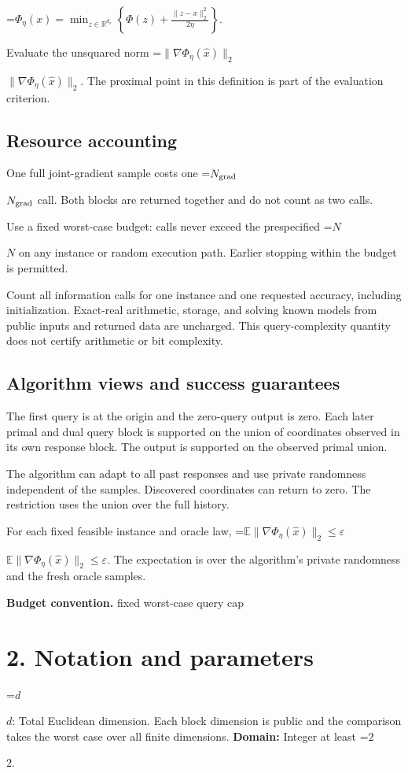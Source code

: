 \documentclass[10pt,a4paper]{article}
\newcommand{\AtlasMath}[1]{\par\begingroup\centering\setbox0=\hbox{$\displaystyle #1$}\ifdim\wd0>1.4\linewidth\typeout{ATLAS WIDE FORMULA: \the\wd0}\fi\ifdim\wd0>\linewidth\resizebox{\linewidth}{!}{\box0}\else\box0\fi\par\endgroup}
\newcommand{\AtlasInlineMath}[1]{\begingroup\setbox0=\hbox{$#1$}\ifdim\wd0>.4\linewidth\endgroup\AtlasMath{#1}\else\endgroup$#1$\fi}
\begin{document}
\AtlasMath{\Phi_\eta(x)=\min_{z\in\mathbb R^{d_x}}\left\{\Phi(z)+\frac{\|z-x\|_2^2}{2\eta}\right\}.}


Evaluate the unsquared norm \AtlasInlineMath{\|\nabla\Phi_{\eta}(\widehat x)\|_2}. The proximal point in this definition is part of the evaluation criterion.

\subsection{Resource accounting}
One full joint-gradient sample costs one \AtlasInlineMath{N_{\rm grad}} call. Both blocks are returned together and do not count as two calls.

Use a fixed worst-case budget: calls never exceed the prespecified \AtlasInlineMath{N} on any instance or random execution path. Earlier stopping within the budget is permitted.

Count all information calls for one instance and one requested accuracy, including initialization. Exact-real arithmetic, storage, and solving known models from public inputs and returned data are uncharged. This query-complexity quantity does not certify arithmetic or bit complexity.

\subsection{Algorithm views and success guarantees}
The first query is at the origin and the zero-query output is zero. Each later primal and dual query block is supported on the union of coordinates observed in its own response block. The output is supported on the observed primal union.

The algorithm can adapt to all past responses and use private randomness independent of the samples. Discovered coordinates can return to zero. The restriction uses the union over the full history.

For each fixed feasible instance and oracle law, \AtlasInlineMath{\mathbb E\|\nabla\Phi_\eta(\widehat x)\|_2\le\varepsilon}. The expectation is over the algorithm's private randomness and the fresh oracle samples.

\textbf{Budget convention.} fixed worst-case query cap

\section{2. Notation and parameters}
\AtlasInlineMath{d}: Total Euclidean dimension. Each block dimension is public and the comparison takes the worst case over all finite dimensions. \textbf{Domain:} Integer at least \AtlasInlineMath{2}.
\end{document}
